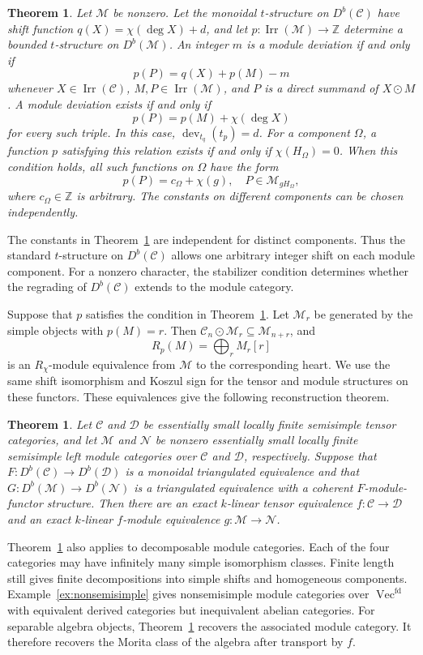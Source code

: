 \documentclass[11pt]{amsart}
\newcommand{\C}{\mathcal C}
\newcommand{\D}{\mathcal D}
\newcommand{\M}{\mathcal M}
\newcommand{\N}{\mathcal N}
\newcommand{\Irr}{\operatorname{Irr}}
\newcommand{\dev}{\operatorname{dev}}
\newcommand{\Vect}{\operatorname{Vec}}
\theoremstyle{definition}
\theoremstyle{remark}
\theoremstyle{plain}
\newtheorem{theoremB}{Theorem}
\newtheorem{theoremC}{Theorem}
\begin{document}
\begin{theoremB}\label{theoremB}
Let $\M$ be nonzero. Let the monoidal $t$-structure on $D^b(\C)$ have shift function $q(X)=\chi(\deg X)+d$, and let $p\colon\Irr(\M)\to\mathbb Z$ determine a bounded $t$-structure on $D^b(\M)$. An integer $m$ is a module deviation if and only if
\[
p(P)=q(X)+p(M)-m
\]
whenever $X\in\Irr(\C)$, $M,P\in\Irr(\M)$, and $P$ is a direct summand of $X\odot M$. 
A module deviation exists if and only if
\[
p(P)=p(M)+\chi(\deg X)
\]
for every such triple. In this case, $\dev_{t_q}(t_p)={d}$.
For a component $\Omega$, a function $p$ satisfying this relation exists if and only if $\chi(H_\Omega)=0$. When this condition holds, all such functions on $\Omega$ have the form
\[
p(P)=c_\Omega+\chi(g),\quad P\in\M_{gH_\Omega},
\]
where $c_\Omega\in\mathbb Z$ is arbitrary. The constants on different components can be chosen independently.
\end{theoremB}


The constants in Theorem~\ref{theoremB} are independent for distinct components. Thus the standard $t$-structure on $D^b(\C)$ allows one arbitrary integer shift on each module component. For a nonzero character, the stabilizer condition determines whether the regrading of $D^b(\C)$ extends to the module category.

Suppose that $p$ satisfies the condition in Theorem~\ref{theoremB}. Let $\M_r$ be generated by the simple objects with $p(M)=r$. Then $\C_n\odot\M_r\subseteq\M_{n+r}$, and
\[
R_p(M)=\bigoplus_r M_r[r]
\]
is an $R_\chi$-module equivalence from $\M$ to the corresponding heart. We use the same shift isomorphism and Koszul sign for the tensor and module structures on these functors. These equivalences give the following reconstruction theorem.

\begin{theoremC}\label{theoremC}
Let $\C$ and $\D$ be essentially small locally finite semisimple tensor categories, and let $\M$ and $\N$ be nonzero essentially small locally finite semisimple left module categories over $\C$ and $\D$, respectively. Suppose that $F: D^b(\C)\to D^b(\D)$ is a monoidal triangulated equivalence and that $G: D^b(\M)\to D^b(\N)$ is a triangulated equivalence with a coherent $F$-module-functor structure. Then there are an exact $k$-linear tensor equivalence $f:\C\to\D$ and an exact $k$-linear $f$-module equivalence $g:\M\to\N$.
\end{theoremC}

Theorem~\ref{theoremC} also applies to decomposable module categories. Each of the four categories may have infinitely many simple isomorphism classes. Finite length still gives finite decompositions into simple shifts and homogeneous components. Example~\ref{ex:nonsemisimple} gives nonsemisimple module categories over $\Vect^{\mathrm{fd}}$ with equivalent derived categories but inequivalent abelian categories. For separable algebra objects, Theorem~\ref{theoremC} recovers the associated module category. It therefore recovers the Morita class of the algebra after transport by $f$.
\end{document}
